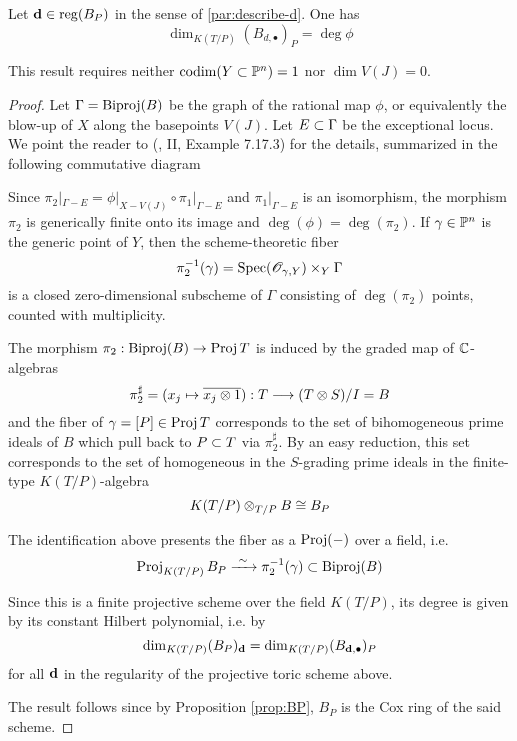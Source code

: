 \documentclass[fleqn,reqno]{amsart}
\numberwithin{first}{chapter}
\begin{document}
\begin{lemma}
\label{lemma:lengthRees}
Let $\mathbf d\in \operatorname{reg}(B_P)$ in the sense of \eqref{par:describe-d}. One has
\[
\dim_{K(T/P)} (B_{d,\bullet})_P=\deg\phi
\]
\end{lemma}

\begin{remarkhint}
This result requires neither $\operatorname{codim}(Y\subset\mathbb{P}^n)=1$ nor $\dim V(J)=0$.
\end{remarkhint}

\begin{proof}
Let $\Gamma=\operatorname{Biproj}(B)$ be the graph of the rational map $\phi$, or equivalently
the blow-up of $X$ along the basepoints $V(J)$. Let $E\subset\Gamma$ be the exceptional
locus.
We point the reader to (\citet{Har-book-77}, II, Example 7.17.3) for the details,
summarized in the following commutative diagram


Since $\pi_2|_{\Gamma-E}=\phi|_{X-V(J)}\circ\pi_1|_{\Gamma-E}$ and $\pi_1|_{\Gamma-E}$ is an isomorphism,
the morphism $\pi_2$ is generically finite onto its image and $\deg(\phi)=\deg(\pi_2)$.
If $\gamma\in\mathbb{P}^n$ is the generic point of $Y$, then the scheme-theoretic fiber
\[
\pi_2^{-1}(\gamma)=\operatorname{Spec}(\mathscr{O}_{\gamma,Y})\times_Y \Gamma
\]
is a closed zero-dimensional subscheme of $\Gamma$ consisting of
$\deg(\pi_2)$ points, counted with multiplicity.

The morphism $\pi_2:\operatorname{Biproj}(B)\to\operatorname{Proj} T$ is induced by the graded map of $\mathbb{C}$-algebras
\[
\pi_2^\sharp=(x_j\mapsto \overline{x_j\otimes1}):T\longrightarrow{(T\otimes S)}/{I}=B
\]
and the fiber of $\gamma=[P]\in\operatorname{Proj} T$ corresponds to the set of bihomogeneous prime ideals of $B$
which pull back to $P\subset T$ via $\pi_2^\sharp$.
By an easy reduction,
this set corresponds to the set of homogeneous in the $S$-grading prime ideals
in the finite-type $K(T/P)$-algebra
\[
K(T/P)\otimes_{T/P}B\cong B_P
\]

The identification above presents the fiber as a $\operatorname{Proj}(-)$ over a field,
i.e.
\[
\operatorname{Proj}_{K(T/P)} B_P\xrightarrow{~\sim~}\pi_2^{-1}(\gamma)\subset\operatorname{Biproj}(B)
\]

Since this is a finite projective scheme over the field $K(T/P)$,
its degree is given by its constant Hilbert polynomial, i.e. by
\[
\dim_{K(T/P)} (B_P)_\mathbf d=\dim_{K(T/P)} (B_{\mathbf d,\bullet})_P
\]
for all $\mathbf d$ in the regularity of the projective toric scheme above.

The result follows since by Proposition \ref{prop:BP},
$B_P$ is the Cox ring of the said scheme.
\end{proof}
\end{document}
